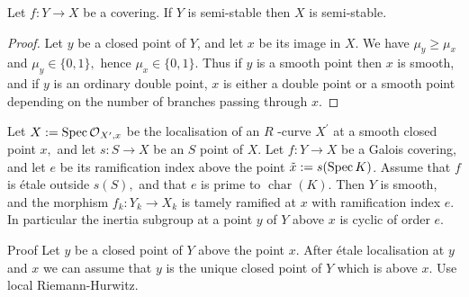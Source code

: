 \begin{frame}
    \begin{proposition}Let $f\colon  Y \rightarrow X$ be a covering. If $Y$ is semi-stable then $X$ is semi-stable.\end{proposition}
    \begin{proof}
        Let $y$ be a closed point of $Y$, and let $x$ be its image in $X$. We have $\mu_{y} \geq \mu_{x}$ and $\mu_{y} \in\{0,1\},$ hence $\mu_{x} \in\{0,1\}$. Thus if $y$ is a smooth point then $x$ is smooth, and if $y$ is an ordinary double point, $x$ is either a double point or a smooth point depending on the number of branches passing through $x$.
    \end{proof}
\end{frame}

\begin{frame}
    \begin{proposition}
        Let $X:=\operatorname{Spec} \operatorname{\mathcal{O}}_{X^{\prime}, x}$ be the localisation of an $R$ -curve $X^{\prime}$ at a smooth closed point $x,$ and let $s: S \rightarrow X$ be an $S$ point of $X$. Let $f: Y \rightarrow X$ be a Galois covering, and let $e$ be its ramification index above the point $\tilde{x}:=s(\operatorname{Spec} K)$. Assume that $f$ is étale outside $s(S),$ and that $e$ is prime to $\operatorname{char}(K)$. Then $Y$ is smooth, and the morphism $f_{k}: Y_{k} \rightarrow X_{k}$ is tamely ramified at $x$ with ramification index $e$. In particular the inertia subgroup at a point $y$ of $Y$ above $x$ is cyclic of order $e$.
    \end{proposition}
    \begin{block}{Proof}
        Let $y$ be a closed point of $Y$ above the point $x$. After étale localisation at $y$ and $x$ we can assume that $y$ is the unique closed point of $Y$ which is above $x$. Use local Riemann-Hurwitz.
    \end{block}
\end{frame}
